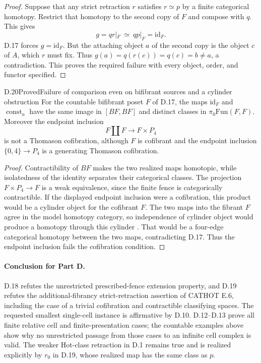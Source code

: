 \begin{proof}
Suppose that any strict retraction $r$ satisfies $r\simeq p$ by a finite categorical homotopy. Restrict that homotopy to the second copy of $F$ and compose with $q$. This gives
\[
 g=qr|_F\ \simeq\ qp|_F=\mathrm{id}_F.
\]
D.17 forces $g=\mathrm{id}_F$. But the attaching object $a$ of the second copy is the object $c$ of $A$, which $r$ must fix. Thus
$g(a)=q(r(c))=q(c)=b\ne a$, a contradiction. This proves the required failure with every object, order, and functor specified.
\end{proof}

\begin{claim}{D.20}{Proved}{Failure of comparison even on bifibrant sources and a cylinder obstruction}
For the countable bifibrant poset $F$ of D.17, the maps $\mathrm{id}_F$ and $\operatorname{const}_a$ have the same image in $[BF,BF]$ and distinct classes in $\pi_0\mathrm{Fun}(F,F)$. Moreover the endpoint inclusion
\[
 F\amalg F\longrightarrow F\times P_4
\]
is not a Thomason cofibration, although $F$ is cofibrant and the endpoint inclusion $\{0,4\}\to P_4$ is a generating Thomason cofibration.
\end{claim}
\begin{proof}
Contractibility of $BF$ makes the two realized maps homotopic, while isolatedness of the identity separates their categorical classes. The projection $F\times P_4\to F$ is a weak equivalence, since the finite fence is categorically contractible. If the displayed endpoint inclusion were a cofibration, this product would be a cylinder object for the cofibrant $F$. The two maps into the fibrant $F$ agree in the model homotopy category, so independence of cylinder object would produce a homotopy through this cylinder \citep[Proposition~A.2.2.1]{CpathsLurieHTT}. That would be a four-edge categorical homotopy between the two maps, contradicting D.17. Thus the endpoint inclusion fails the cofibration condition.
\end{proof}

\paragraph{Conclusion for Part D.}
D.18 refutes the unrestricted prescribed-fence extension property, and D.19 refutes the additional-fibrancy strict-retraction assertion of CATHOT E.6, including the case of a trivial cofibration and contractible classifying spaces. The requested smallest single-cell instance is affirmative by D.10. D.12--D.13 prove all finite relative cell and finite-presentation cases; the countable examples above show why no unrestricted passage from those cases to an infinite cell complex is valid. The weaker Hot-class retraction in D.1 remains true and is realized explicitly by $r_0$ in D.19, whose realized map has the same class as $p$.
